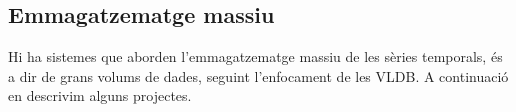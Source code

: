 




\subsection{Emmagatzematge massiu}
\label{art:massius}

Hi ha sistemes que aborden l'emmagatzematge massiu de les
sèries temporals, és a dir de grans volums de dades, seguint
l'enfocament de les \gls{VLDB}.  A continuació en descrivim alguns
projectes.



